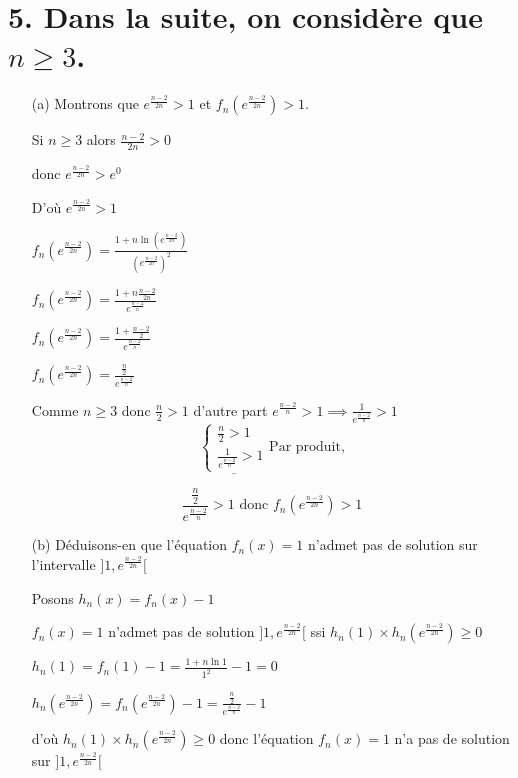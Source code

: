 \documentclass[12pt]{article}
\begin{document}
\section*{5. Dans la suite, on considère que $n\geq 3$.}
\begin{itemize}
\item[(a)] Montrons que $ e^{\frac{n-2}{2n}} > 1 $ et $f_{n}(e^{\frac{n-2}{2n}}) > 1$.

Si $n\geq 3$ alors $\frac{n-2}{2n}>0$

donc $ e^{\frac{n-2}{2n}} > e^{0} $

D'où $ e^{\frac{n-2}{2n}} > 1 $

$f_n(e^{\frac{n-2}{2n}}) = \frac{1 + n \ln \left( e^{\frac{n-2}{2n}}\right)}{\left( e^{\frac{n-2}{2n}}\right) ^2}$

$f_n(e^{\frac{n-2}{2n}}) = \frac{1 + n\frac{n-2}{2n}}{e^{\frac{n-2}{n}}}$

$f_n(e^{\frac{n-2}{2n}}) = \frac{1 + \frac{n-2}{2}}{e^{\frac{n-2}{n}}}$

$f_n(e^{\frac{n-2}{2n}}) = \frac{\frac{n}{2}}{e^{\frac{n-2}{n}}}$

Comme $n\geq 3$ donc $\frac{n}{2}>1$ d'autre part $e^{\frac{n-2}{n}}>1\implies \frac{1}{e^{\frac{n-2}{n}}}>1$ 
\[
\underline{
\begin{cases}
\frac{n}{2}>1\\
\frac{1}{e^{\frac{n-2}{n}}}>1
\end{cases}}
\text{Par produit,}
\]

\[
\frac{\frac{n}{2}}{e^{\frac{n-2}{n}}}>1 \text{ donc } f_n(e^{\frac{n-2}{2n}})>1
\]
\item[(b)] Déduisons-en que l'équation $f_{n}(x)=1$ n'admet pas de solution sur l'intervalle $]1,e^{\frac{n-2}{2n}}[$

Posons $h_{n}(x)=f_{n}(x)-1$

$f_{n}(x)=1$ n'admet pas de solution $]1,e^{\frac{n-2}{2n}}[$ ssi $h_{n}(1) \times h_{n}(e^{\frac{n-2}{2n}})\geq 0$

$h_{n}(1)=f_{n}(1)-1=\frac{1+n\ln 1}{1^{2}}-1=0$

$h_{n}(e^{\frac{n-2}{2n}})=f_{n}(e^{\frac{n-2}{2n}})-1=\frac{\frac{n}{2}}{e^{\frac{n-2}{n}}}-1$

d'où $h_{n}(1)\times h_{n}(e^{\frac{n-2}{2n}})\geq 0$ donc l'équation $f_{n}(x)=1$ n'a pas de solution sur $]1,e^{\frac{n-2}{2n}}[$
\end{itemize}
\end{document}
